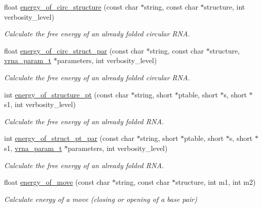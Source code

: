 \begin{DoxyCompactItemize}
float \hyperlink{group__eval_gaeb14f3664aec67fc03268ac75253f0f8}{energy\+\_\+of\+\_\+circ\+\_\+structure} (const char $\ast$string, const char $\ast$structure, int verbosity\+\_\+level)
\begin{DoxyCompactList}\small\item\em Calculate the free energy of an already folded circular R\+N\+A. \end{DoxyCompactList}\item 
float \hyperlink{group__eval_ga3f01f9744ba6a40555eb4d81fc77f6df}{energy\+\_\+of\+\_\+circ\+\_\+struct\+\_\+par} (const char $\ast$string, const char $\ast$structure, \hyperlink{group__energy__parameters_ga8a69ca7d787e4fd6079914f5343a1f35}{vrna\+\_\+param\+\_\+t} $\ast$parameters, int verbosity\+\_\+level)
\begin{DoxyCompactList}\small\item\em Calculate the free energy of an already folded circular R\+N\+A. \end{DoxyCompactList}\item 
int \hyperlink{group__eval_ga8831445966b761417e713360791299d8}{energy\+\_\+of\+\_\+structure\+\_\+pt} (const char $\ast$string, short $\ast$ptable, short $\ast$s, short $\ast$s1, int verbosity\+\_\+level)
\begin{DoxyCompactList}\small\item\em Calculate the free energy of an already folded R\+N\+A. \end{DoxyCompactList}\item 
int \hyperlink{group__eval_ga49acb3d5627dc6823a7ce12d116d4c69}{energy\+\_\+of\+\_\+struct\+\_\+pt\+\_\+par} (const char $\ast$string, short $\ast$ptable, short $\ast$s, short $\ast$s1, \hyperlink{group__energy__parameters_ga8a69ca7d787e4fd6079914f5343a1f35}{vrna\+\_\+param\+\_\+t} $\ast$parameters, int verbosity\+\_\+level)
\begin{DoxyCompactList}\small\item\em Calculate the free energy of an already folded R\+N\+A. \end{DoxyCompactList}\item 
float \hyperlink{group__eval_ga539ecaed89730f7644c202f304d7529b}{energy\+\_\+of\+\_\+move} (const char $\ast$string, const char $\ast$structure, int m1, int m2)
\begin{DoxyCompactList}\small\item\em Calculate energy of a move (closing or opening of a base pair) \end{DoxyCompactList}\item 

\end{DoxyCompactItemize}
